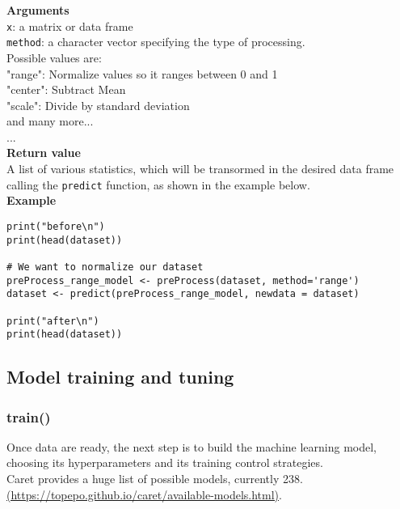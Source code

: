 \documentclass{article}
\begin{document}
\textbf{Arguments}\\

\texttt{x}: a matrix or data frame\\
\texttt{method}: a character vector specifying the type of processing. \\
\phantom{..............} Possible values are:\\
\phantom{..............} "range": Normalize values so it ranges between 0 and 1\\
\phantom{..............} "center": Subtract Mean\\
\phantom{..............} "scale": Divide by standard deviation\\
\phantom{..............} and many more...\\
...\\

\textbf{Return value}\\
A list of various statistics, which will be transormed in the desired data frame calling the \texttt{predict} function, as shown in the example below.\\

\textbf{Example}\\
\begin{lstlisting}
print("before\n")
print(head(dataset))

# We want to normalize our dataset
preProcess_range_model <- preProcess(dataset, method='range')
dataset <- predict(preProcess_range_model, newdata = dataset)

print("after\n")
print(head(dataset))
\end{lstlisting}

\subsection{Model training and tuning}
\subsubsection{train()}
Once data are ready, the next step is to build the machine learning model, choosing its hyperparameters and its training control strategies.\\

Caret provides a huge list of possible models, currently 238.\\
\href{https://topepo.github.io/caret/available-models.html}{(https://topepo.github.io/caret/available-models.html)}.\\
\end{document}
